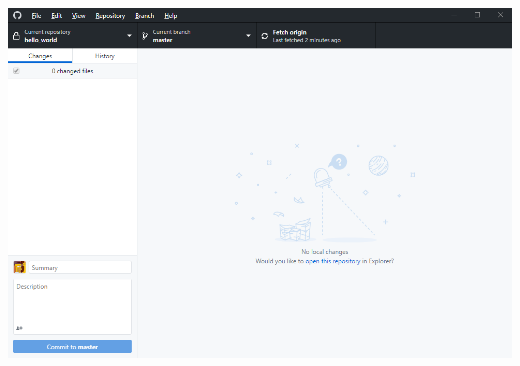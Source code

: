 \documentclass[12pt, letter]{article}
\begin{document}
    \includegraphics{screenshots/shot11.bmp}
\end{document}
